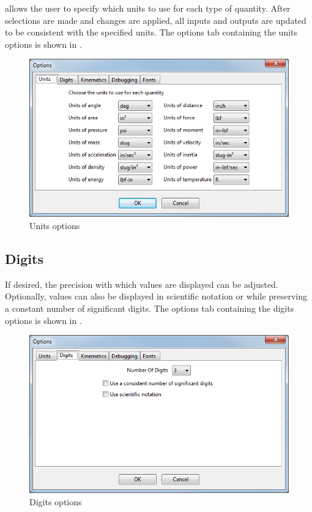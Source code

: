 \vvase{} allows the user to specify which units to use for each type of quantity.  After selections are made and changes are applied, all inputs and outputs are updated to be consistent with the specified units.  The options tab containing the units options is shown in .

\begin{figure}
  \includegraphics[width=\textwidth]{images/optionsUnits}
  \caption{Units options} \label{fig:optionsUnits}
  \centering
\end{figure}

\subsection{Digits} \label{ssec:optionsDigits}

If desired, the precision with which values are displayed can be adjusted.  Optionally, values can also be displayed in scientific notation or while preserving a constant number of significant digits.  The options tab containing the digits options is shown in .

\begin{figure}
  \includegraphics[width=\textwidth]{images/optionsDigits}
  \caption{Digits options} \label{fig:optionsDigits}
  \centering
\end{figure}


